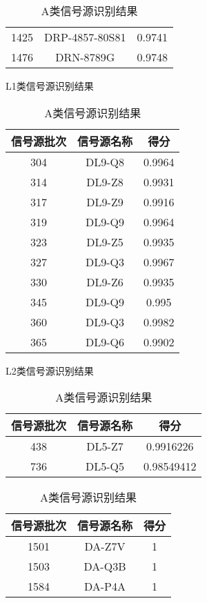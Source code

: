 \begin{table}[htbp]
\begin{minipage}[htbp]{7.5cm}
\begin{tabular}{ccc}
			1425 & DRP-4857-80S81 & 0.9741 \\
			1476 & DRN-8789G      & 0.9748	\\
			\bottomrule
		\end{tabular}
	\end{minipage}
	\begin{minipage}[htbp]{7.5cm}
		\centering
		\begin{minipage}[htbp]{7.5cm}
			\centering
			\caption{L1类信号源识别结果}
			\begin{tabular}{ccc}
				\toprule
				信号源批次	&	信号源名称	&	得分			\\
				\midrule
				304 & DL9-Q8 & 0.9964 \\
				314 & DL9-Z8 & 0.9931 \\
				317 & DL9-Z9 & 0.9916 \\
				319 & DL9-Q9 & 0.9964 \\
				323 & DL9-Z5 & 0.9935 \\
				327 & DL9-Q3 & 0.9967 \\
				330 & DL9-Z6 & 0.9935 \\
				345 & DL9-Q9 & 0.995  \\
				360 & DL9-Q3 & 0.9982 \\
				365 & DL9-Q6 & 0.9902	\\
				\bottomrule
			\end{tabular}
		\end{minipage}
		\begin{minipage}[htbp]{7.5cm}
			\centering
			\caption{L2类信号源识别结果}
			\begin{tabular}{ccc}
				\toprule
				信号源批次	&	信号源名称	&	得分			\\
				\midrule
				438 & DL5-Z7 & 0.9916226  \\
				736 & DL5-Q5 & 0.98549412	\\
				\bottomrule
			\end{tabular}
		\end{minipage}
		\begin{minipage}[htbp]{7.5cm}
			\centering
			\caption{A类信号源识别结果}
			\begin{tabular}{ccc}
				\toprule
				信号源批次	&	信号源名称	&	得分		\\
				\midrule
				1501 & DA-Z7V & 1 \\
				1503 & DA-Q3B & 1 \\
				1584 & DA-P4A & 1	\\
				\bottomrule
			\end{tabular}
		\end{minipage}
	\end{minipage}
\end{table}
\clearpage
\clearpage
\newpage
